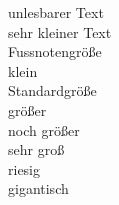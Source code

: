 \tiny unlesbarer Text \\
\scriptsize sehr kleiner Text \\
\footnotesize Fussnotengröße \\
\small klein \\
\normalsize Standardgröße \\
\large größer \\
\Large noch größer \\	
\LARGE sehr groß \\
\huge riesig \\
\Huge gigantisch \\
